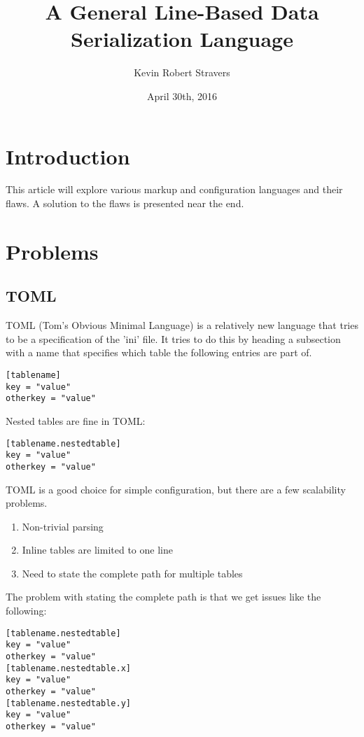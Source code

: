 \documentclass[listof=totoc]{article}
\title{A General Line-Based Data Serialization Language}
\author{Kevin Robert Stravers}
\date{April 30th, 2016}
\begin{document}
\maketitle

\iffalse
	\tableofcontents
	\lstlistoflistings
\fi

\section{Introduction}
This article will explore various markup and configuration languages and their flaws. A solution to the flaws is presented near the end.
\section{Problems}

\subsection{TOML}
TOML (Tom's Obvious Minimal Language) is a relatively new language that tries to be a specification of the 'ini' file.
It tries to do this by heading a subsection with a name that specifies which table the following entries are part of.

\begin{verbatim}
[tablename]
key = "value"
otherkey = "value"
\end{verbatim}

Nested tables are fine in TOML:

\begin{verbatim}
[tablename.nestedtable]
key = "value"
otherkey = "value"
\end{verbatim}

TOML is a good choice for simple configuration, but there are a few scalability problems.

\begin{enumerate}
	\item Non-trivial parsing
	\item Inline tables are limited to one line
	\item Need to state the complete path for multiple tables
\end{enumerate}

The problem with stating the complete path is that we get issues like the following:

\begin{verbatim}
[tablename.nestedtable]
key = "value"
otherkey = "value"
[tablename.nestedtable.x]
key = "value"
otherkey = "value"
[tablename.nestedtable.y]
key = "value"
otherkey = "value"
\end{verbatim}
\end{document}
